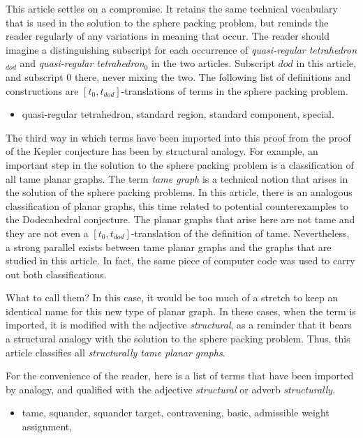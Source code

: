 This article settles on a compromise.
It retains the same technical vocabulary that is used in the solution
to the sphere packing problem, but  reminds the reader regularly
of any variations in meaning that occur.  The reader should
imagine a distinguishing subscript for each occurrence of {\it quasi-regular tetrahedron$_{dod}$}
and 
{\it quasi-regular tetrahedron$_0$} in the two articles.  
Subscript $dod$ in this article, 
and subscript $0$
there, never mixing the two.
The following list
of definitions and constructions are $[t_0,t_{dod}]$-translations 
of terms in the sphere
packing problem.

\begin{itemize}
\item quasi-regular tetrahedron, standard region, standard component, special.
\end{itemize}

The third way in which terms have been imported into this proof
from the proof of the Kepler conjecture has been by structural
analogy.  For example, an important step in the solution to the
sphere packing problem is a classification of all tame planar graphs.
The term {\it tame graph} is a technical notion that arises in
the solution of the sphere packing problems.  In this article,
there is an analogous classification of planar graphs, this time
related to potential counterexamples to the Dodecahedral conjecture.
The planar graphs that arise here are not tame and they are
not even a $[t_0,t_{dod}]$-translation of the definition of tame.  
Nevertheless, a strong parallel exists between tame planar graphs 
and the graphs that are studied in this article.  
In fact, the same piece of computer
code was used to carry out both classifications. 

What to call them?  In this case, it would be too much of a stretch
to keep an identical name for this new type of planar graph.
In these cases, when the term is imported,  it is modified with
the adjective {\it structural}, as a reminder that it
bears a structural
analogy with the solution to the sphere
packing problem.  Thus, this article classifies all
{\it structurally tame planar graphs}.

For the convenience of the reader, here is a list of terms that
have been imported by analogy, and qualified with the adjective
{\it structural} or adverb {\it structurally}.

\begin{itemize}
\item tame, squander, squander target, contravening, basic, admissible weight assignment,
\end{itemize}

